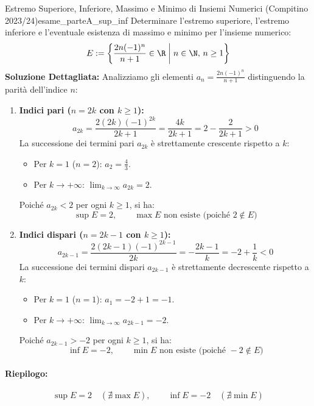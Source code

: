 \begin{esempio}{Estremo Superiore, Inferiore, Massimo e Minimo di Insiemi Numerici (Compitino 2023/24)}{esame_parteA_sup_inf}
Determinare l'estremo superiore, l'estremo inferiore e l'eventuale esistenza di massimo e minimo per l'insieme numerico:
\[
    E := \left\{ \frac{2n (-1)^n}{n + 1} \in \R \;\middle|\; n \in \N, \, n \ge 1 \right\}
\]
\tcblower
\textbf{Soluzione Dettagliata:}
Analizziamo gli elementi $a_n = \frac{2n(-1)^n}{n+1}$ distinguendo la parità dell'indice $n$:
\begin{enumerate}
    \item \textbf{Indici pari ($n = 2k$ con $k \ge 1$):}
    \[
        a_{2k} = \frac{2(2k)(-1)^{2k}}{2k + 1} = \frac{4k}{2k + 1} = 2 - \frac{2}{2k + 1} > 0
    \]
    La successione dei termini pari $a_{2k}$ è strettamente crescente rispetto a $k$:
    \begin{itemize}
        \item Per $k = 1$ ($n = 2$): $a_2 = \frac{4}{3}$.
        \item Per $k \to +\infty$: $\lim_{k \to \infty} a_{2k} = 2$.
    \end{itemize}
    Poiché $a_{2k} < 2$ per ogni $k \ge 1$, si ha:
    \[
        \sup E = 2, \qquad \max E \text{ non esiste (poiché } 2 \notin E\text{)}
    \]
    \item \textbf{Indici dispari ($n = 2k - 1$ con $k \ge 1$):}
    \[
        a_{2k-1} = \frac{2(2k-1)(-1)^{2k-1}}{2k} = -\frac{2k - 1}{k} = -2 + \frac{1}{k} < 0
    \]
    La successione dei termini dispari $a_{2k-1}$ è strettamente decrescente rispetto a $k$:
    \begin{itemize}
        \item Per $k = 1$ ($n = 1$): $a_1 = -2 + 1 = -1$.
        \item Per $k \to +\infty$: $\lim_{k \to \infty} a_{2k-1} = -2$.
    \end{itemize}
    Poiché $a_{2k-1} > -2$ per ogni $k \ge 1$, si ha:
    \[
        \inf E = -2, \qquad \min E \text{ non esiste (poiché } -2 \notin E\text{)}
    \]
\end{enumerate}
\paragraph{Riepilogo:}
\[
    \sup E = 2 \quad (\nexists \max E), \qquad \inf E = -2 \quad (\nexists \min E)
\]
\end{esempio}
